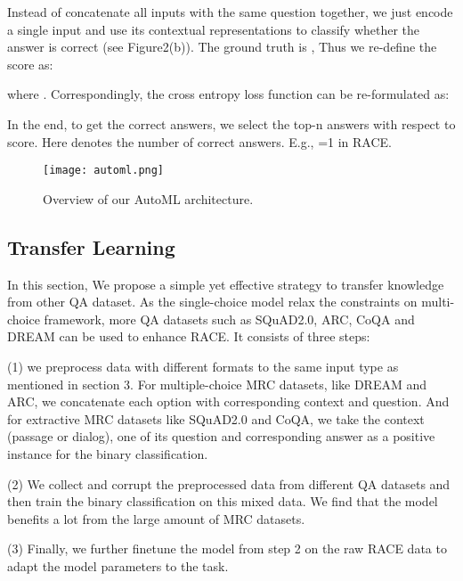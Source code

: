 \documentclass[11pt,a4paper]{article}
\begin{document}
Instead of concatenate all inputs with the same question together, we just  encode a single input and use its contextual representations  to classify whether the answer is correct (see Figure2(b)). The ground truth is , Thus we re-define the score   as:

where . Correspondingly, the cross entropy loss function can be re-formulated as:


In the end, to get the correct answers, we select the top-n answers with respect to score. Here  denotes the number of correct answers. E.g., =1 in RACE. 

\begin{figure}[htb!]
\texttt{[image: automl.png]}
\flushleft
\caption{Overview of our AutoML architecture.}
\label{fig:automl}
\end{figure}

\subsection{Transfer Learning}

In this section, We propose a simple yet effective strategy to transfer knowledge from other QA dataset. As the single-choice model relax the constraints on multi-choice framework, more QA datasets such as SQuAD2.0, ARC, CoQA and DREAM can be used to enhance RACE. It consists of three steps:

(1) we preprocess data with different formats to the same input type as mentioned in section 3. For multiple-choice MRC datasets, like DREAM and ARC, we concatenate each option with corresponding context and question.
And for extractive MRC datasets like SQuAD2.0 and CoQA, we take the context (passage or dialog), one of its question and corresponding answer as a positive instance for the binary classification.

(2) We collect and corrupt the preprocessed data from different QA datasets
and then train the binary classification on this mixed data. We find that the model benefits a lot from the large amount of MRC datasets.

(3) Finally, we further finetune the model from step 2 on the raw RACE data to adapt the model parameters to the task.
 
\end{document}
